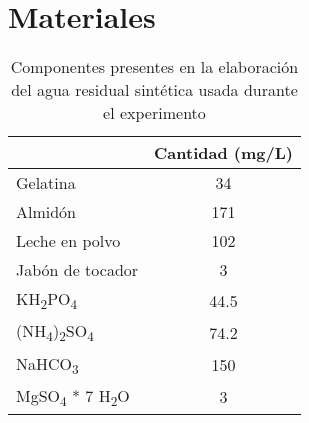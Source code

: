 \section{Materiales}
\begin{table}[H]
	\centering
	\caption{Componentes presentes en la elaboración del agua residual sintética usada durante el experimento}
	\label{tab:agua-sint}
	\begin{tabular}{|l|c|}
		\hline
		\rowcolor[HTML]{C0C0C0} 
		\multicolumn{1}{|c|}{\cellcolor[HTML]{C0C0C0}Componente} & Cantidad (mg/L) \\ \hline
		Gelatina                                                 & 34              \\ \hline
		Almidón                                                  & 171             \\ \hline
		Leche en polvo                                           & 102             \\ \hline
		Jabón de tocador                                         & 3               \\ \hline
		KH\textsubscript{2}PO\textsubscript{4}                   & 44.5            \\ \hline
		(NH\textsubscript{4})\textsubscript{2}SO\textsubscript{4}& 74.2            \\ \hline
		NaHCO\textsubscript{3}                                   & 150             \\ \hline
		MgSO\textsubscript{4} * 7 H\textsubscript{2}O                                      & 3               \\ \hline
	\end{tabular}
\end{table}